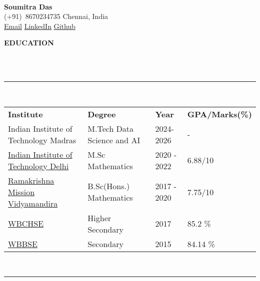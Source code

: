 \documentclass[a4paper,10pt]{article}
\newcommand\tab[1][0.5cm]{\hspace*{#1}}
\newcommand{\lsep}{-0.5cm}
\newcommand{\resheading}[1]{{\small \colorbox{mygrey}{\begin{minipage}{0.975\textwidth}{\textbf{#1 \vphantom{p\^{E}}}}\end{minipage}}}}
\begin{document}
\hspace{0.5cm}\\[-0.2cm]
\begin{center}
    
    \textbf{\huge Soumitra Das} \\
    (+91)\ 8670234735 \tab Chennai, India \\ 
    \href{mailto:soumitra.py@gmail.com}{Email} \tab
    \href{https://www.linkedin.com/in/soumitra-das-1b36901b9}{LinkedIn} \tab
    \href{https://github.com/soumitrapy}{Github}\\

\end{center}


\resheading{\textbf{EDUCATION} }\\[\lsep]
\\
\indent \rule{6.8in}{0.4pt}\\
\indent \begin{tabular}{ l @{\hskip 0.15in} l @{\hskip 0.15in} l @{\hskip 0.15in} l @{\hskip 0.15in} }
\noindent \textbf{Institute} & \textbf{Degree} & \textbf{Year} & \textbf{GPA/Marks(\%)}\\
Indian Institute of Technology Madras & M.Tech Data Science and AI & 2024-2026 & -\\
\href{https://github.com/soumitrapy/resume/blob/main/docs/transcript_original.pdf}{Indian Institute of Technology Delhi} & M.Sc Mathematics & 2020 - 2022 & 6.88/10\\
\href{https://github.com/soumitrapy/resume/blob/main/docs/cons_marksheet.pdf}{Ramakrishna Mission Vidyamandira} & B.Sc(Hons.) Mathematics & 2017 - 2020 & 7.75/10\\
\href{https://github.com/soumitrapy/resume/blob/main/docs/hs.pdf}{WBCHSE} & Higher Secondary & 2017 & 85.2 \% \\
\href{https://github.com/soumitrapy/resume/blob/main/docs/secondary.pdf}{WBBSE} & Secondary & 2015 & 84.14 \% \\

\end{tabular}
\\
\indent \rule{6.8in}{0.4pt}
\\
\end{document}
